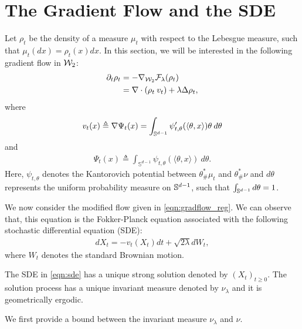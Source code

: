 
\section{The Gradient Flow and the SDE}

Let $\rho_t$ be the density of a measure $\mu_t$ with respect to the Lebesgue measure, such that $\mu_t(dx) = \rho_t(x) dx$. In this section, we will be interested in the following gradient flow in ${\cal W}_2$:
\begin{align}
\partial_t \rho_t &= - \nabla_{{\cal W}_2} {\cal F}_\lambda(\rho_t) \\
&=  \nabla \cdot (\rho_t \> v_t) + \lambda \Delta \rho_t, \label{eqn:gradflow_reg}
\end{align}
where 
\begin{align}
v_t(x) \triangleq \nabla \Psi_t(x) = \int_{\mathbb{S}^{d-1}} \psi'_{t,\theta}(\langle \theta, x \rangle) \theta \> d\theta \label{eqn:idt_v}
\end{align}
and
\begin{align}
\Psi_t(x) \triangleq \int_{\mathbb{S}^{d-1}} \psi_{t,\theta}(\langle \theta, x \rangle) \> d\theta.
\end{align}
Here, $\psi_{t,\theta}$ denotes the Kantorovich potential between $\theta^*_{\#}\mu_t$ and $\theta^*_{\#}\nu$ and $d\theta$ represents the uniform probability measure on $\mathbb{S}^{d-1}$, such that $\int_{\mathbb{S}^{d-1}} d \theta = 1$.

We now consider the modified flow given in \eqref{eqn:gradflow_reg}. We can observe that, this equation is the Fokker-Planck equation associated with the following stochastic differential equation (SDE):
\begin{align}
d X_t = - v_t(X_t) dt + \sqrt{2 \lambda } d W_t, \label{eqn:sde}
\end{align}
where $W_t$ denotes the standard Brownian motion.

\begin{assumption}
\label{asmp:sde_ergo}
The SDE in \eqref{eqn:sde} has a unique strong solution denoted by $(X_t)_{t\geq 0}$. The solution process has a unique invariant measure denoted by $\nu_\lambda$ and it is geometrically ergodic. 
\end{assumption}

We first provide a bound between the invariant measure $\nu_\lambda$ and $\nu$.


